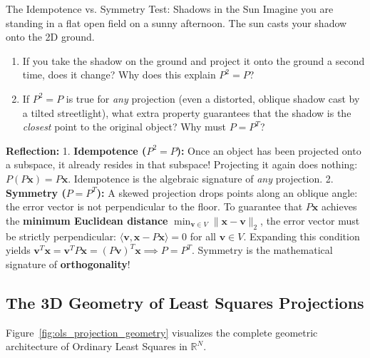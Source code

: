 \begin{ponderbox}{The Idempotence vs. Symmetry Test: Shadows in the Sun}
Imagine you are standing in a flat open field on a sunny afternoon. The sun casts your shadow onto the 2D ground.
\begin{enumerate}
    \item If you take the shadow on the ground and project it onto the ground a second time, does it change? Why does this explain $P^2 = P$?
    \item If $P^2 = P$ is true for \emph{any} projection (even a distorted, oblique shadow cast by a tilted streetlight), what extra property guarantees that the shadow is the \emph{closest} point to the original object? Why must $P = P^T$?
\end{enumerate}
\tcblower
\textbf{Reflection:}
1. \textbf{Idempotence ($P^2 = P$):} Once an object has been projected onto a subspace, it already resides in that subspace! Projecting it again does nothing: $P(P\mathbf{x}) = P\mathbf{x}$. Idempotence is the algebraic signature of \emph{any} projection.
2. \textbf{Symmetry ($P = P^T$):} A skewed projection drops points along an oblique angle: the error vector is not perpendicular to the floor. To guarantee that $P\mathbf{x}$ achieves the \textbf{minimum Euclidean distance} $\min_{\mathbf{v} \in V}\|\mathbf{x} - \mathbf{v}\|_2$, the error vector must be strictly perpendicular: $\langle \mathbf{v}, \mathbf{x} - P\mathbf{x} \rangle = 0$ for all $\mathbf{v} \in V$. Expanding this condition yields $\mathbf{v}^T \mathbf{x} = \mathbf{v}^T P \mathbf{x} = (P\mathbf{v})^T \mathbf{x} \implies P = P^T$. Symmetry is the mathematical signature of \textbf{orthogonality}!
\end{ponderbox}

\subsection{The 3D Geometry of Least Squares Projections}
Figure~\ref{fig:ols_projection_geometry} visualizes the complete geometric architecture of Ordinary Least Squares in $\mathbb{R}^N$.

